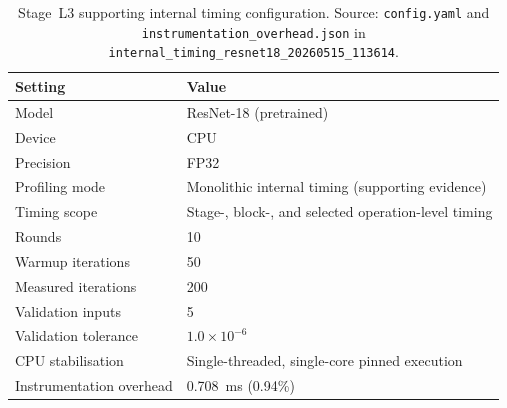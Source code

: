 \begin{table}[t]
\centering
\caption[Stage~L3 internal timing configuration]{Stage~L3 supporting internal timing configuration. Source: \texttt{config.yaml} and \texttt{instrumentation\_overhead.json} in \texttt{internal\_timing\_resnet18\_20260515\_113614}.}
\label{tab:rq13-config}
\begin{tabular}{ll}
\toprule
\textbf{Setting} & \textbf{Value} \\
\midrule
Model                       & ResNet-18 (pretrained) \\
Device                      & CPU \\
Precision                   & FP32 \\
Profiling mode              & Monolithic internal timing (supporting evidence) \\
Timing scope                & Stage-, block-, and selected operation-level timing \\
Rounds                      & 10 \\
Warmup iterations           & 50 \\
Measured iterations         & 200 \\
Validation inputs           & 5 \\
Validation tolerance        & $1.0 \times 10^{-6}$ \\
CPU stabilisation           & Single-threaded, single-core pinned execution \\
Instrumentation overhead    & 0.708~ms (0.94\%) \\
\bottomrule
\end{tabular}
\end{table}

